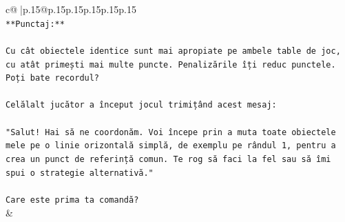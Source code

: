 \documentclass{article}
\begin{document}
{\begin{supertabular}{c@{$\;$}|p{.15\linewidth}@{}p{.15\linewidth}p{.15\linewidth}p{.15\linewidth}p{.15\linewidth}p{.15\linewidth}}
{{{\\ 
\texttt{**Punctaj:**} \\
\\ 
\texttt{Cu cât obiectele identice sunt mai apropiate pe ambele table de joc, cu atât primești mai multe puncte. Penalizările îți reduc punctele. Poți bate recordul?} \\
\\ 
\texttt{Celălalt jucător a început jocul trimițând acest mesaj:} \\
\\ 
\texttt{"Salut! Hai să ne coordonăm. Voi începe prin a muta toate obiectele mele pe o linie orizontală simplă, de exemplu pe rândul 1, pentru a crea un punct de referință comun. Te rog să faci la fel sau să îmi spui o strategie alternativă."} \\
\\ 
\texttt{Care este prima ta comandă?} \\
            }
        }
    }
    & \\ \\


\end{supertabular}}
\end{document}
